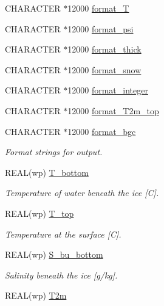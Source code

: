 \begin{DoxyCompactItemize}
CHARACTER $\ast$12000 \hyperlink{namespacemo__data_abe2cc97e4da609edede5040d2574b93f}{format\_\-T}
\item 
CHARACTER $\ast$12000 \hyperlink{namespacemo__data_a5a4d1d7b7cad308de5f2a051715e95d5}{format\_\-psi}
\item 
CHARACTER $\ast$12000 \hyperlink{namespacemo__data_acb2cd425e31735f68ad118da5eed1392}{format\_\-thick}
\item 
CHARACTER $\ast$12000 \hyperlink{namespacemo__data_ad94f3b5a63bb78de820fe5a8c6f5574c}{format\_\-snow}
\item 
CHARACTER $\ast$12000 \hyperlink{namespacemo__data_a6e3f24460d266c05576103895a7167be}{format\_\-integer}
\item 
CHARACTER $\ast$12000 \hyperlink{namespacemo__data_a15b8dd299b9b9a34d337f74ea3e8b676}{format\_\-T2m\_\-top}
\item 
CHARACTER $\ast$12000 \hyperlink{namespacemo__data_ac2bdb68249acc513c69fb2793f6f376c}{format\_\-bgc}
\begin{DoxyCompactList}\small\item\em Format strings for output. \item\end{DoxyCompactList}\item 
REAL(wp) \hyperlink{namespacemo__data_a2ac8e0a672ebfd49781702474bf4ba0e}{T\_\-bottom}
\begin{DoxyCompactList}\small\item\em Temperature of water beneath the ice \mbox{[}C\mbox{]}. \item\end{DoxyCompactList}\item 
REAL(wp) \hyperlink{namespacemo__data_abefbe1cf82237d7380ba0d7de788a07a}{T\_\-top}
\begin{DoxyCompactList}\small\item\em Temperature at the surface \mbox{[}C\mbox{]}. \item\end{DoxyCompactList}\item 
REAL(wp) \hyperlink{namespacemo__data_ad14bbccac75eb3a3d95f57d0ecb81816}{S\_\-bu\_\-bottom}
\begin{DoxyCompactList}\small\item\em Salinity beneath the ice \mbox{[}g/kg\mbox{]}. \item\end{DoxyCompactList}\item 
REAL(wp) \hyperlink{namespacemo__data_a987a45ea7aa457299f91119864d0baff}{T2m}

\end{DoxyCompactItemize}
